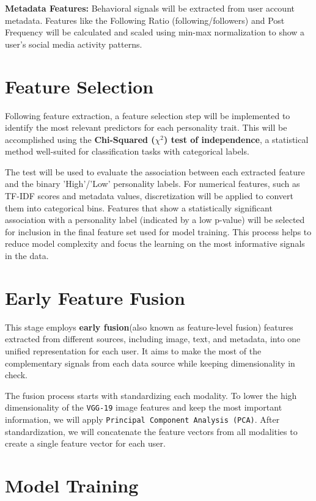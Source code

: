 \textbf{Metadata Features: }
Behavioral signals will be extracted from user account metadata. Features like the Following Ratio (following/followers) and Post Frequency will be calculated and scaled using min-max normalization to show a user's social media activity patterns.

\section{Feature Selection}
Following feature extraction, a feature selection step will be implemented to identify the most relevant predictors for each personality trait. This will be accomplished using the \textbf{Chi-Squared ($\chi^2$) test of independence}, a statistical method well-suited for classification tasks with categorical labels.

The test will be used to evaluate the association between each extracted feature and the binary 'High'/'Low' personality labels. For numerical features, such as TF-IDF scores and metadata values, discretization will be applied to convert them into categorical bins. Features that show a statistically significant association with a personality label (indicated by a low p-value) will be selected for inclusion in the final feature set used for model training. This process helps to reduce model complexity and focus the learning on the most informative signals in the data.

\section{Early Feature Fusion}
\label{subsec:fusion}
This stage employs \textbf{early fusion}(also known as feature-level fusion) features extracted from different sources, including image, text, and metadata, into one unified representation for each user. It aims to make the most of the complementary signals from each data source while keeping dimensionality in check. 

The fusion process starts with standardizing each modality. To lower the high dimensionality of the \texttt{VGG-19} image features and keep the most important information, we will apply \texttt{Principal Component Analysis (PCA)}. After standardization, we will concatenate the feature vectors from all modalities to create a single feature vector for each user. 

\section{Model Training}
\label{subsec:models}

